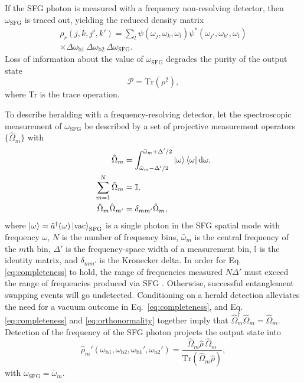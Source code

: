 \documentclass[twocolumn,amssymb, nobibnotes, showpacs, aps, pra,10pt]{revtex4-1}
\newcommand*{\wbone}{\omega_{\textrm{b}1}}
\newcommand*{\wbtwo}{\omega_{\textrm{b}2}}
\newcommand*{\wsfg}{\omega_\textrm{SFG}}
\newcommand*\diff{\mathop{}\!\mathrm{d}}
\begin{document}
If the SFG photon is measured with a frequency non-resolving detector, then $\wsfg$ is traced out, yielding the reduced density matrix \cite{Kolenderski2009,Kolenderski2009b}
\begin{equation} \label{eq:reducedDensityMatrix2} 
\begin{split}
\rho_r(j,k,j',k')= \sum_l \psi(\omega_j, \omega_k, \omega_l) \psi^*(\omega_{j'}, \omega_{k'}, \omega_l)\\
\times \Delta \wbone \, \Delta \wbtwo \, \Delta \wsfg.
\end{split}
\end{equation}
Loss of information about the value of $\wsfg$ degrades the purity of the output state 
\begin{equation} \label{eq:purity}
\mathcal{P} = \text{Tr} (\rho^2 ),
\end{equation}
where Tr is the trace operation.

To describe heralding with a frequency-resolving detector, let the spectroscopic measurement of $\wsfg$ be described by a set of projective measurement operators $\{\hat{\Omega}_m \}$ with
\begin{align}
\hat{\Omega}_m &= \int_{\bar{\omega}_m-\Delta'/2}^{\bar{\omega}_m+\Delta'/2} \ket{\omega} \bra{\omega} \diff \omega, \label{eq:Omega} \\
\sum_{m=1}^N \hat{\Omega}_m &= \mathbb{I}, \label{eq:completeness}\\
\hat{\Omega}_m \hat{\Omega}_{m'} &= \delta_{mm'} \hat{\Omega}_m, \label{eq:orthonormality}
\end{align}
where $\ket{\omega} = \hat{a}^{\dagger} (\omega) \ket{\text{vac}}_{\text{SFG}}$ is a single photon in the SFG spatial mode with frequency $\omega$, $N$ is the number of frequency bins, $\bar{\omega}_m$ is the central frequency of the $m$th bin, $\Delta'$ is the frequency-space width of a measurement bin, $\mathbb{I}$ is the identity matrix, and $\delta_{mm'}$ is the Kronecker delta. In order for Eq. \eqref{eq:completeness} to hold, the range of frequencies measured $N \Delta'$ must exceed the range of frequencies produced via SFG . Otherwise, successful entanglement swapping events will go undetected. Conditioning on a herald detection alleviates the need for a vacuum outcome in Eq.\ \eqref{eq:completeness}, and Eq. \eqref{eq:completeness} and \eqref{eq:orthonormality} together imply that $\hat{\Omega}_m^\dagger \hat{\Omega}_m = \hat{\Omega}_m$. Detection of the frequency of the SFG photon projects the output state into
\begin{equation} \label{eq:RhoMeasured}
\hat{\rho}_m' (\wbone,\wbtwo,\wbone',\wbtwo') = \frac{\hat{\Omega}_m \hat{\rho} \,  \hat{\Omega}_m}{\text{Tr} \left( \hat{\Omega}_m \hat{\rho} \right)},
\end{equation}
with $\wsfg = \bar{\omega}_m$.
\end{document}
